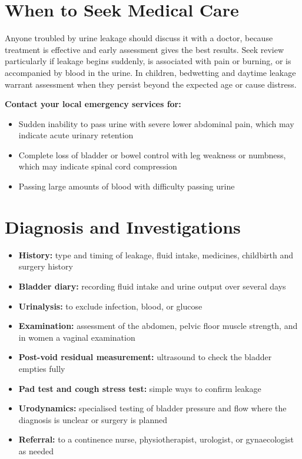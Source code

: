 \section*{When to Seek Medical Care}
Anyone troubled by urine leakage should discuss it with a doctor, because treatment is effective and early assessment gives the best results. Seek review particularly if leakage begins suddenly, is associated with pain or burning, or is accompanied by blood in the urine. In children, bedwetting and daytime leakage warrant assessment when they persist beyond the expected age or cause distress.

\textbf{Contact your local emergency services for:}
\begin{itemize}
    \item Sudden inability to pass urine with severe lower abdominal pain, which may indicate acute urinary retention
    \item Complete loss of bladder or bowel control with leg weakness or numbness, which may indicate spinal cord compression
    \item Passing large amounts of blood with difficulty passing urine
\end{itemize}

\section*{Diagnosis and Investigations}
\begin{itemize}
    \item \textbf{History:} type and timing of leakage, fluid intake, medicines, childbirth and surgery history
    \item \textbf{Bladder diary:} recording fluid intake and urine output over several days
    \item \textbf{Urinalysis:} to exclude infection, blood, or glucose
    \item \textbf{Examination:} assessment of the abdomen, pelvic floor muscle strength, and in women a vaginal examination
    \item \textbf{Post-void residual measurement:} ultrasound to check the bladder empties fully
    \item \textbf{Pad test and cough stress test:} simple ways to confirm leakage
    \item \textbf{Urodynamics:} specialised testing of bladder pressure and flow where the diagnosis is unclear or surgery is planned
    \item \textbf{Referral:} to a continence nurse, physiotherapist, urologist, or gynaecologist as needed
\end{itemize}

